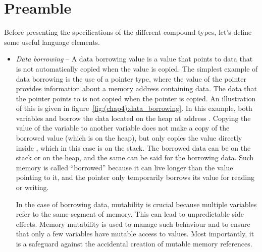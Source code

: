 \section{Preamble}%
\label{sec:preamble_compound_types}

Before presenting the specifications of the different compound types, let's
define some useful language elements.

\begin{itemize}
\item \textit{Data borrowing} -- A data borrowing value is a value that points
  to data that is not automatically copied when the value is copied. The
  simplest example of data borrowing is the use of a pointer type, where the
  value of the pointer provides information about a memory address containing
  data. The data that the pointer points to is not copied when the pointer is
  copied. An illustration of this is given in figure~\ref{fig:(chap4):data_borrowing}.
  In this example, both variables  and  borrow the data
  located on the heap at address . Copying the value of the
  variable  to another variable does not make a copy of the borrowed
  value (which is on the heap), but only copies the value directly inside
  , which in this case is on the stack. The borrowed data can be on
  the stack or on the heap, and the same can be said for the borrowing data.
  Such memory is called ``borrowed'' because it can live longer than the value
  pointing to it, and the pointer only temporarily borrows its value for reading
  or writing.

  In the case of borrowing data, mutability is crucial because multiple variables
  refer to the same segment of memory. This can lead to unpredictable side
  effects. Memory mutability is used to manage such behaviour and to ensure that
  only a few variables have mutable access to values. Most importantly, it is a
  safeguard against the accidental creation of mutable memory references.


\end{itemize}



